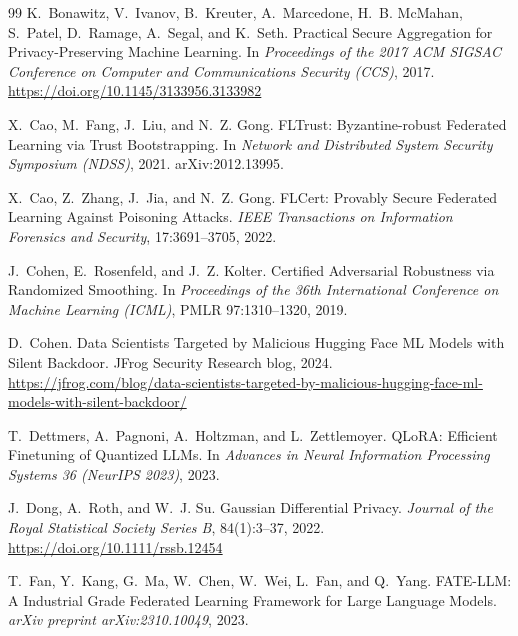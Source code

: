 \documentclass[11pt]{article}
\theoremstyle{plain}
\theoremstyle{definition}
\theoremstyle{remark}
\begin{document}
\begin{thebibliography}{99}
K.~Bonawitz, V.~Ivanov, B.~Kreuter, A.~Marcedone, H.~B. McMahan, S.~Patel, D.~Ramage, A.~Segal, and K.~Seth.
\newblock Practical Secure Aggregation for Privacy-Preserving Machine Learning.
\newblock In \emph{Proceedings of the 2017 ACM SIGSAC Conference on Computer and Communications Security (CCS)}, 2017.
\newblock \url{https://doi.org/10.1145/3133956.3133982}

X.~Cao, M.~Fang, J.~Liu, and N.~Z. Gong.
\newblock FLTrust: Byzantine-robust Federated Learning via Trust Bootstrapping.
\newblock In \emph{Network and Distributed System Security Symposium (NDSS)}, 2021.
\newblock arXiv:2012.13995.

X.~Cao, Z.~Zhang, J.~Jia, and N.~Z. Gong.
\newblock FLCert: Provably Secure Federated Learning Against Poisoning Attacks.
\newblock \emph{IEEE Transactions on Information Forensics and Security}, 17:3691--3705, 2022.

J.~Cohen, E.~Rosenfeld, and J.~Z. Kolter.
\newblock Certified Adversarial Robustness via Randomized Smoothing.
\newblock In \emph{Proceedings of the 36th International Conference on Machine Learning (ICML)}, PMLR 97:1310--1320, 2019.

D.~Cohen.
\newblock Data Scientists Targeted by Malicious Hugging Face ML Models with Silent Backdoor.
\newblock JFrog Security Research blog, 2024.
\newblock \url{https://jfrog.com/blog/data-scientists-targeted-by-malicious-hugging-face-ml-models-with-silent-backdoor/}

T.~Dettmers, A.~Pagnoni, A.~Holtzman, and L.~Zettlemoyer.
\newblock QLoRA: Efficient Finetuning of Quantized LLMs.
\newblock In \emph{Advances in Neural Information Processing Systems 36 (NeurIPS 2023)}, 2023.

J.~Dong, A.~Roth, and W.~J. Su.
\newblock Gaussian Differential Privacy.
\newblock \emph{Journal of the Royal Statistical Society Series B}, 84(1):3--37, 2022.
\newblock \url{https://doi.org/10.1111/rssb.12454}

T.~Fan, Y.~Kang, G.~Ma, W.~Chen, W.~Wei, L.~Fan, and Q.~Yang.
\newblock FATE-LLM: A Industrial Grade Federated Learning Framework for Large Language Models.
\newblock \emph{arXiv preprint arXiv:2310.10049}, 2023.


\end{thebibliography}
\end{document}
